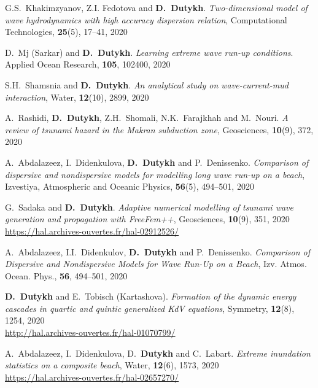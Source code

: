 \begin{etaremune}
  \item G.S.~Khakimzyanov, Z.I. Fedotova and \textbf{D.~Dutykh}. \textit{Two-dimensional model of wave hydrodynamics with high accuracy dispersion relation}, Computational Technologies, \textbf{25}(5), 17--41, 2020 %
  
  \item D.~Mj (Sarkar) and \textbf{D.~Dutykh}. \textit{Learning extreme wave run-up conditions}. Applied Ocean Research, \textbf{105}, 102400, 2020 %
  
  \item S.H.~Shamsnia and \textbf{D.~Dutykh}. \textit{An analytical study on wave-current-mud interaction}, Water, \textbf{12}(10), 2899, 2020 %
  
  \item A.~Rashidi, \textbf{D.~Dutykh}, Z.H.~Shomali, N.K.~Farajkhah and M.~Nouri. \textit{A review of tsunami hazard in the Makran subduction zone}, Geosciences, \textbf{10}(9), 372, 2020 %
  
  \item A.~Abdalazeez, I.~Didenkulova, \textbf{D.~Dutykh} and P.~Denissenko. \textit{Comparison of dispersive and nondispersive models for modelling long wave run-up on a beach}, Izvestiya, Atmospheric and Oceanic Physics, \textbf{56}(5), 494--501, 2020 %
  
  \item G.~Sadaka and \textbf{D.~Dutykh}. \textit{Adaptive numerical modelling of tsunami wave generation and propagation with FreeFem++}, Geosciences, \textbf{10}(9), 351, 2020 \\ %
  \url{https://hal.archives-ouvertes.fr/hal-02912526/}
  
  \item A.~Abdalazeez, I.I.~Didenkulov, \textbf{D.~Dutykh} and P.~Denissenko. \textit{Comparison of Dispersive and Nondispersive Models for Wave Run-Up on a Beach}, Izv. Atmos. Ocean. Phys., \textbf{56}, 494--501, 2020 %
  
  \item \textbf{D.~Dutykh} and E.~Tobisch (Kartashova). \textit{Formation of the dynamic energy cascades in quartic and quintic generalized KdV equations}, Symmetry, \textbf{12}(8), 1254, 2020 \\ %
  \url{http://hal.archives-ouvertes.fr/hal-01070799/}
  
  \item A.~Abdalazeez, I.~Didenkulova, D.~\textbf{Dutykh} and C.~Labart. \textit{Extreme inundation statistics on a composite beach}, Water, \textbf{12}(6), 1573, 2020 \\ %
  \url{https://hal.archives-ouvertes.fr/hal-02657270/}
  

\end{etaremune}
